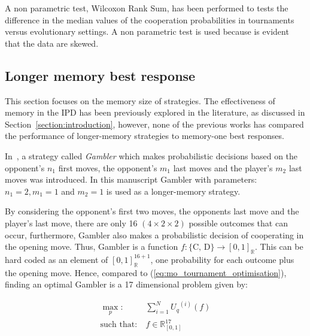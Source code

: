 \documentclass[10pt]{article}
\newcommand{\R}{\mathbb{R}}
\begin{document}
\begin{table}[!htbp]
    \centering
    \resizebox{.7\columnwidth}{!}{%
    }
    \caption{A non parametric test, Wilcoxon Rank Sum, has been performed to
    tests the difference in the median values of the cooperation probabilities
    in tournaments versus evolutionary settings. A non parametric test is used because
    is evident that the data are skewed.}\label{table:wilcoxon_tests}
\end{table}

\subsection{Longer memory best response}\label{subsection:longer_memory_best_response}

This section focuses on the memory size of strategies. The effectiveness of
memory in the IPD has been previously explored in the literature, as
discussed in Section~\ref{section:introduction}, however, none of the
previous works has compared the performance of longer-memory strategies to
memory-one best responses.

In~\cite{Harper2017}, a strategy called \textit{Gambler} which makes
probabilistic decisions based on the opponent's \(n_1\) first moves, the
opponent's \(m_1\) last moves and the player's \(m_2\) last moves was
introduced. In this manuscript Gambler with parameters: $n_1 = 2, m_1 = 1$ and $m_2 = 1$ is used
as a longer-memory strategy.

By considering the opponent's first two moves, the opponents last move and the
player's last move, there are only 16 $(4 \times 2 \times 2)$ possible outcomes
that can occur, furthermore, Gambler also makes a probabilistic decision of
cooperating in the opening move. Thus, Gambler is a function \(f: \{\text{C,
D}\} \rightarrow [0, 1]_{\R}\). This can be hard coded as an element
of \([0, 1]_{\R} ^ {16 + 1}\), one probability for each outcome plus the opening
move. Hence, compared to (\ref{eq:mo_tournament_optimisation}), finding an
optimal Gambler is a 17 dimensional problem given by:

\begin{equation}\label{eq:gambler_optimisation}
    \begin{aligned}
    \max_p: & \ \sum_{i=1} ^ {N} {U_q}^{(i)} (f)
    \\
    \text{such that}: & \ f \in \R_{[0, 1]}^{17}
    \end{aligned}
\end{equation}
\end{document}
